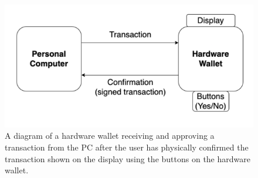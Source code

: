 \documentclass[]{article}
\begin{document}
\begin{figure}
\centering
\includegraphics{Hardware-Wallet-Diagram.png}
\caption{A diagram of a hardware wallet receiving and approving a transaction from the PC after the user has physically confirmed the transaction shown on the display using the buttons on the hardware wallet.}
\label{fig:figure1}
\end{figure}
\end{document}
